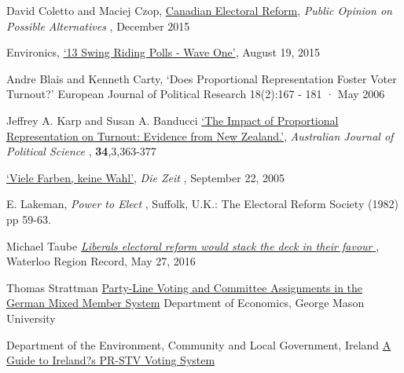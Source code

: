 \documentclass[DIV=calc, paper=a4, fontsize=11pt, twocolumn]{scrartcl}	 %
\begin{document}
\begin{thebibliography}{99} %

David Coletto and Maciej Czop,
{\color{blue} \href{https://d3n8a8pro7vhmx.cloudfront.net/broadbent/pages/4770/attachments/original/1448994262/Canadian_Electoral_Reform_-_Report.pdf?1448994262}{Canadian Electoral Reform}},
{\emph{Public Opinion on Possible Alternatives} }, December 2015

Environics,
{\color{blue} \href{http://www.votetogether.ca/pages/localpolling/}{`13 Swing Riding Polls - Wave One'}}, August 19, 2015

Andre Blais and Kenneth Carty, 
`Does Proportional Representation Foster Voter Turnout?'
European Journal of Political Research 18(2):167 - 181 · May 2006

Jeffrey A. Karp and Susan A. Banducci
{\color{blue} \href{http://www.jkarp.com/pdf/ajps_1999.pdf}{`The Impact of Proportional Representation on Turnout: Evidence from New Zealand.'}},
{ \emph{Australian Journal of Political Science} }, \textbf{34},3,363-377

  
{\color{blue} \href{http://www.zeit.de/2005/39/Wahl\_paradox}{`Viele Farben, keine Wahl'}},
 { \emph{Die Zeit} }, September 22, 2005

E. Lakeman,
{ \emph{Power to Elect} }, Suffolk, U.K.: The Electoral Reform Society (1982) pp 59-63.

 Michael Taube
{\color{blue} \href{http://www.therecord.com/opinion-story/6692466-liberals-electoral-reform-would-stack-the-deck-in-their-favour/}{ \emph{Liberals electoral reform would stack the deck in their favour} } },
Waterloo Region Record, May 27, 2016 

Thomas Strattman
{\color{blue} \href{http://www.gmu.edu/centers/publicchoice/faculty%20pages/stratmann/vitae%20files/bunddev.pdf}{Party-Line Voting and Committee Assignments in the German Mixed Member System}}
Department of Economics, George Mason University

Department of the Environment, Community and Local Government, Ireland
{\color{blue} \href{http://www.environ.ie/sites/default/files/publications/files/guide_to_ireland_pr-stv_system_0.pdf}{A Guide to Ireland?s PR-STV Voting System}}
 
\end{thebibliography}
\end{document}
